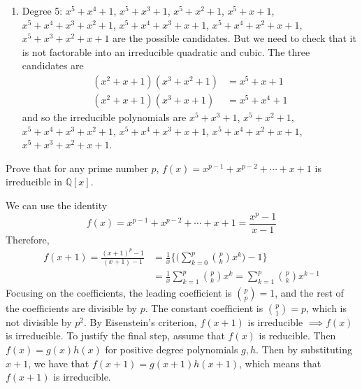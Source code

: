 \begin{solution}
\begin{enumerate}
      \item Degree 5: $x^5 + x^4 + 1$, $x^5 + x^3 + 1$, $x^5 + x^2 + 1$, $x^5 + x + 1$, $x^5 + x^4 + x^3 + x^2 + 1$, $x^5 + x^4 + x^3 + x + 1$, $x^5 + x^4 + x^2 + x + 1$, $x^5 + x^3 + x^2 + x + 1$ are the possible candidates. But we need to check that it is not factorable into an irreducible quadratic and cubic. The three candidates are 
      \begin{align}
        (x^2 + x + 1)(x^3 + x^2 + 1) & = x^5 + x + 1 \\
        (x^2 + x + 1)(x^3 + x + 1) & = x^5 + x^4 + 1
      \end{align}
      and so the irreducible polynomials are $x^5 + x^3 + 1$, $x^5 + x^2 + 1$, $x^5 + x^4 + x^3 + x^2 + 1$, $x^5 + x^4 + x^3 + x + 1$, $x^5 + x^4 + x^2 + x + 1$, $x^5 + x^3 + x^2 + x + 1$. 
    \end{enumerate}
  \end{solution}

  \begin{exercise}[Shifrin 3.3.7]
    Prove that for any prime number $p$, $f(x) = x^{p-1} + x^{p-2} + \cdots + x + 1$ is irreducible in $\mathbb{Q}[x]$.
  \end{exercise}
  \begin{solution}
    We can use the identity 
    \begin{equation}
      f(x) = x^{p-1} + x^{p-2} + \cdots + x + 1 = \frac{x^p - 1}{x - 1} 
    \end{equation}
    Therefore, 
    \begin{align}
      f(x+1) = \frac{(x+1)^p - 1}{(x + 1) - 1} & = \frac{1}{x}\bigg\{ \bigg( \sum_{k=0}^p \binom{p}{k} x^k \bigg) - 1 \bigg\} \\
                                               & = \frac{1}{x} \sum_{k=1}^p \binom{p}{k} x^k =  \sum_{k=1}^p \binom{p}{k} x^{k-1}
    \end{align}
    Focusing on the coefficients, the leading coefficient is $\binom{p}{p} = 1$, and the rest of the coefficients are divisible by $p$. The constant coefficient is $\binom{p}{1} = p$, which is not divisible by $p^2$. By Eisenstein's criterion, $f(x+1)$ is irreducible $\implies f(x)$ is irreducible. To justify the final step, assume that $f(x)$ is reducible. Then $f(x) = g(x) h(x)$ for positive degree polynomials $g, h$. Then by substituting $x + 1$, we have that $f(x+1) = g(x+1) h(x+1)$, which means that $f(x+1)$ is irreducible. 
  \end{solution}

